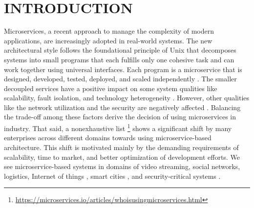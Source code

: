 \section{INTRODUCTION}

Microservices, a recent approach to manage the complexity of modern applications, are increasingly adopted in real-world systems. The new architectural style follows the foundational principle of Unix that decomposes systems into small programs \cite{wolff2016microservices} that each fulfills only one cohesive task and can work together using universal interfaces. Each program is a microservice that is designed, developed, tested,  deployed, and scaled independently \cite{microservicesfrowler}. The smaller decoupled services have a positive impact on some system qualities like scalability, fault isolation, and technology heterogeneity \cite{newman2015building}. However, other qualities like the network utilization and the security are negatively affected \cite{ahmadvand2016requirements}.  Balancing the trade-off among these factors derive the decision of using microservices in industry. That said, a nonexhaustive list \footnote{\url{https://microservices.io/articles/whoisusingmicroservices.html}} shows a significant shift by many enterprises across different domains towards using microservice-based architecture. This shift is motivated mainly by the demanding requirements of scalability, time to market, and better optimization of development efforts. We see microservice-based systems in domains of video streaming, social networks, logistics, Internet of things \cite{butzin2016microservices}, smart cities \cite{krylovskiy2015designing}, and security-critical systems \cite{fetzer2016building}. 

